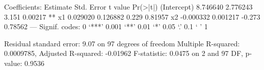 Coefficients:
             Estimate Std. Error t value Pr(>|t|)   
(Intercept)  8.746640   2.776243   3.151  0.00217 **
x1           0.029020   0.126882   0.229  0.81957   
x2          -0.000332   0.001217  -0.273  0.78562   
---
Signif. codes:  0 ‘***’ 0.001 ‘**’ 0.01 ‘*’ 0.05 ‘.’ 0.1 ‘ ’ 1

Residual standard error: 9.07 on 97 degrees of freedom
Multiple R-squared:  0.0009785,	Adjusted R-squared:  -0.01962 
F-statistic: 0.0475 on 2 and 97 DF,  p-value: 0.9536

